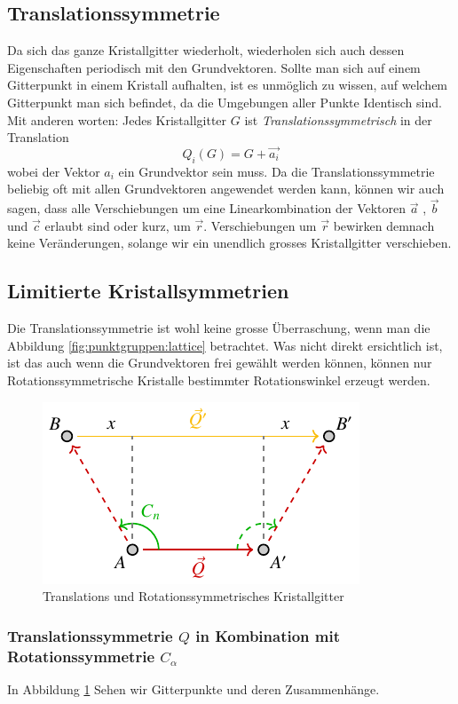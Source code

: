 \subsection{Translationssymmetrie}
Da sich das ganze Kristallgitter wiederholt, wiederholen sich auch dessen Eigenschaften periodisch mit den Grundvektoren.
Sollte man sich auf einem Gitterpunkt in einem Kristall aufhalten, ist es unmöglich zu wissen, auf welchem Gitterpunkt man sich befindet, 
da die Umgebungen aller Punkte Identisch sind. 
Mit anderen worten: Jedes Kristallgitter $ G $ ist \emph{Translationssymmetrisch} in der Translation 
\[
    Q_i(G) = G + \vec{a_i}
\] wobei der Vektor $a_i$ ein Grundvektor sein muss.
Da die Translationssymmetrie beliebig oft mit allen Grundvektoren angewendet werden kann, 
können wir auch sagen, dass alle Verschiebungen um eine Linearkombination 
der Vektoren $\vec{a}$ , $\vec{b}$ und $\vec{c}$ erlaubt sind oder kurz, um $\vec{r}$. 
Verschiebungen um $\vec{r}$ bewirken demnach keine Veränderungen, 
solange wir ein unendlich grosses Kristallgitter verschieben.

\subsection{Limitierte Kristallsymmetrien}
 Die Translationssymmetrie ist wohl keine grosse Überraschung, wenn man die Abbildung \ref{fig:punktgruppen:lattice} betrachtet.
 Was nicht direkt ersichtlich ist, ist das auch wenn die Grundvektoren frei gewählt werden können, 
 können nur Rotationssymmetrische Kristalle bestimmter Rotationswinkel erzeugt werden.

\begin{figure}
    \centering
    \includegraphics[]{papers/punktgruppen/figures/combine-symmetries}
    \caption{Translations und Rotationssymmetrisches Kristallgitter}
    \label{fig:punktgruppen:rot-geometry}
\end{figure}

 \subsubsection{Translationssymmetrie $Q$ in Kombination mit Rotationssymmetrie $C_\alpha$}     %
 In Abbildung \ref{fig:punktgruppen:rot-geometry} Sehen wir Gitterpunkte und deren Zusammenhänge.

